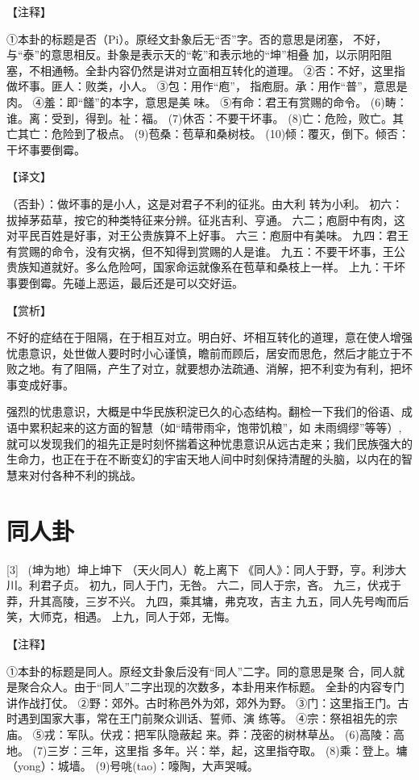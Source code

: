 \documentclass[12pt,UTF8]{ctexbook}
\begin{document}
【注释】

①本卦的标题是否（Pi）。原经文卦象后无“否”字。否的意思是闭塞， 不好，与“泰”的意思相反。卦象是表示天的“乾”和表示地的“坤”相叠 加，以示阴阳阻塞，不相通畅。全卦内容仍然是讲对立面相互转化的道理。
②否：不好，这里指做坏事。匪人：败类，小人。
③包：用作“庖”， 指庖厨。承：用作“普”，意思是肉。
④羞：即“饈”的本字，意思是美 味。
⑤有命：君王有赏赐的命令。
(6)畴：谁。离：受到，得到。祉：福。
(7)休否：不要干坏事。
(8)亡：危险，败亡。其亡其亡：危险到了极点。
(9)苞桑：苞草和桑树枝。
(10)倾：覆灭，倒下。倾否：干坏事要倒霉。

【译文】

（否卦）：做坏事的是小人，这是对君子不利的征兆。由大利 转为小利。
初六：拔掉茅茹草，按它的种类特征来分辨。征兆吉利、亨通。
六二；庖厨中有肉，这对平民百姓是好事，对王公贵族算不上好事。
六三：庖厨中有美味。
九四：君王有赏赐的命令，没有灾祸，但不知得到赏赐的人是谁。
九五：不要干坏事，王公贵族知道就好。多么危险呵，国家命运就像系在苞草和桑枝上一样。
上九：干坏事要倒霉。先碰上恶运，最后还是可以交好运。

【赏析】

不好的症结在于阻隔，在于相互对立。明白好、坏相互转化的道理，意在使人增强忧患意识，处世做人要时时小心谨慎，瞻前而顾后，居安而思危，然后才能立于不败之地。有了阻隔，产生了对立，就要想办法疏通、消解，把不利变为有利，把坏事变成好事。

强烈的忧患意识，大概是中华民族积淀已久的心态结构。翻检一下我们的俗语、成语中累积起来的这方面的智慧（如“晴带雨伞，饱带饥粮”，如 未雨绸缪”等等）, 就可以发现我们的祖先正是时刻怀揣着这种忧患意识从远古走来；我们民族强大的生命力，也正在于在不断变幻的宇宙天地人间中时刻保持清醒的头脑，以内在的智慧来对付各种不利的挑战。

\chapter{同人卦}
[3] \ (坤为地）坤上坤下
（天火同人）乾上离下
《同人》：同人于野，亨。利涉大川。利君子贞。
初九，同人于门，无咎。
六二，同人于宗，吝。
九三，伏戎于莽，升其高陵，三岁不兴。
九四，乘其墉，弗克攻，吉主
九五，同人先号啕而后笑，大师克，相遇。
上九，同人于郊，无悔。

【注释】

①本卦的标题是同人。原经文卦象后没有“同人”二字。同的意思是聚 合，同人就是聚合众人。由于“同人”二字出现的次数多，本卦用来作标题。 全卦的内容专门讲作战打仗。
②野：郊外。古时称邑外为郊，郊外为野。
③门：这里指王门。古时遇到国家大事，常在王门前聚众训话、誓师、演 练等。
④宗：祭祖祖先的宗庙。
⑤戎：军队。伏戎：把军队隐蔽起 来。莽：茂密的树林草丛。
(6)高陵：高地。
(7)三岁：三年，这里指 多年。兴：举，起，这里指夺取。
(8)乘：登上。墉（yong）：城墙。
(9)号咷(tao)：嚎陶，大声哭喊。
\end{document}
